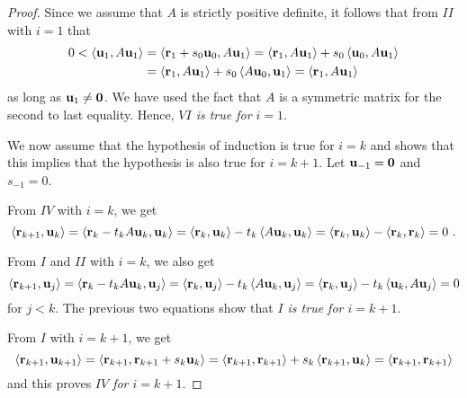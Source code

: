 \begin{proof}
Since we assume that $A$ is strictly positive definite, it follows
that from $II$ with $i=1$ that
\begin{align*}
0 < \left\langle{\mathbf{u}_1} , {A\mathbf{u}_1}\right\rangle
& = \left\langle{\mathbf{r}_1 + s_0 \mathbf{u}_0} , {A\mathbf{u}_1}\right\rangle
= \left\langle{\mathbf{r}_1} , {A\mathbf{u}_1}\right\rangle + s_0 \left\langle{\mathbf{u}_0} , {A\mathbf{u}_1}\right\rangle \\
& = \left\langle{\mathbf{r}_1} , {A\mathbf{u}_1}\right\rangle + s_0 \left\langle{A\mathbf{u}_0} , {\mathbf{u}_1}\right\rangle
= \left\langle{\mathbf{r}_1} , {A\mathbf{u}_1}\right\rangle
\end{align*}
as long as $\mathbf{u}_1 \neq \mathbf{0}$.  We have used the fact that $A$
is a symmetric matrix for the second to last equality.  Hence,
{\em $VI$ is true for $i=1$}.


We now assume that the hypothesis of induction is true for $i=k$ and
shows that this implies that the hypothesis is also true for $i=k+1$.
Let $\mathbf{u}_{-1} = \mathbf{0}$ and $s_{-1} = 0$.

From $IV$ with $i=k$, we get
\[
\ps{\VEC{r}_{k+1}}{\VEC{u}_k} = \ps{\VEC{r}_k - t_k A \VEC{u}_k}{\VEC{u}_k}
= \ps{\VEC{r}_k}{\VEC{u}_k} - t_k \ps{A\VEC{u}_k}{\VEC{u}_k}
= \ps{\VEC{r}_k}{\VEC{u}_k} - \ps{\VEC{r}_k}{\VEC{r}_k} = 0 \ .
\]

From $I$ and $II$ with $i=k$, we also get
\[
\left\langle{\mathbf{r}_{k+1}} , {\mathbf{u}_j}\right\rangle = \left\langle{\mathbf{r}_k - t_k A \mathbf{u}_k} , {\mathbf{u}_j}\right\rangle
= \left\langle{\mathbf{r}_k} , {\mathbf{u}_j}\right\rangle - t_k \left\langle{A\mathbf{u}_k} , {\mathbf{u}_j}\right\rangle
= \left\langle{\mathbf{r}_k} , {\mathbf{u}_j}\right\rangle - t_k \left\langle{\mathbf{u}_k} , {A\mathbf{u}_j}\right\rangle = 0
\]
for $j<k$.  The previous two equations show that
{\em $I$ is true for $i=k+1$}.

From $I$ with $i=k+1$, we get
\[
\left\langle{\mathbf{r}_{k+1}} , {\mathbf{u}_{k+1}}\right\rangle
= \left\langle{\mathbf{r}_{k+1}} , {\mathbf{r}_{k+1} + s_k\mathbf{u}_k}\right\rangle
= \left\langle{\mathbf{r}_{k+1}} , {\mathbf{r}_{k+1}}\right\rangle + s_k \left\langle{\mathbf{r}_{k+1}} , {\mathbf{u}_k}\right\rangle
= \left\langle{\mathbf{r}_{k+1}} , {\mathbf{r}_{k+1}}\right\rangle
\]
and this proves {\em $IV$ for $i=k+1$}.


\end{proof}
